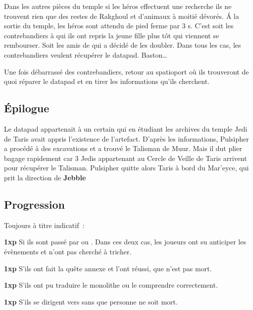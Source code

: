 Dans les autres pièces du temple si les héros effectuent une recherche ils ne trouvent rien que des restes de Rakghoul et d’animaux à moitié dévorés.
\'A la sortie du temple, les héros sont attendu de pied ferme par 3 s. C’est soit les contrebandiers à qui ils ont repris la jeune fille plus tôt qui viennent se rembourser. Soit les amis de  qui a décidé de les doubler. Dans tous les cas, les contrebandiers veulent récupérer le datapad. Baston\ldots

Une fois débarrassé des contrebandiers, retour au spatioport où ils trouveront de quoi réparer le datapad et en tirer les informations qu’ils cherchent.

\subsection{\'Epilogue}
Le datapad appartenait à un certain  qui en étudiant les archives du temple Jedi de Taris avait appris l’existence de l’artefact. D’après les informations, Pulsipher a procédé à des excavations et a trouvé le Talisman de Muur. Mais il dut plier bagage rapidement car 3 Jedis appartenant au Cercle de Veille de Taris arrivent pour récupérer le Talisman. Pulsipher quitte alors Taris à bord du Mar’eyce, qui prit la direction de \textbf{Jebble}

\subsection{Progression}
Toujours à titre indicatif~:
\begin{rebelist}
    \item \textbf{1xp} Si ils sont passé par  ou . Dans ces deux cas, les joueurs ont su anticiper les évènements et n’ont pas cherché à tricher.
    \item \textbf{1xp} S’ils ont fait la quête annexe et l’ont réussi, que  n’est pas mort.
    \item \textbf{1xp} S’ils ont pu traduire le monolithe ou le comprendre correctement.
    \item \textbf{1xp} S’ils se dirigent vers  sans que personne ne soit mort.
\end{rebelist}

